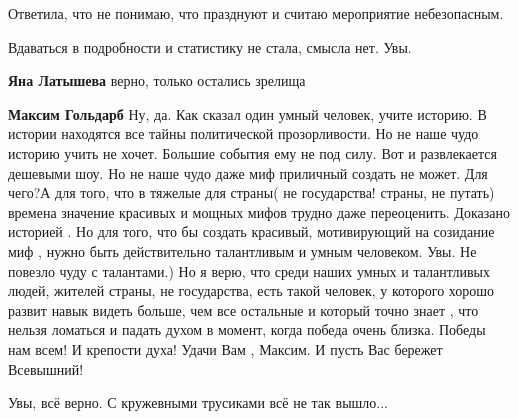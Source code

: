 \begin{itemize}
Ответила, что не понимаю, что празднуют и считаю мероприятие небезопасным.

Вдаваться в подробности и статистику не стала, смысла нет. Увы.

\begin{itemize}
 
\textbf{Яна Латышева} верно, только остались зрелища

 
\textbf{Максим Гольдарб} Ну, да. Как сказал один умный человек, учите историю.
В истории находятся все тайны политической прозорливости. Но не наше чудо
историю учить не хочет. Большие события ему не под силу. Вот и развлекается
дешевыми шоу. Но не наше чудо даже миф приличный создать не может. Для чего?А
для того, что в тяжелые для страны( не государства! страны, не путать) времена
значение красивых и мощных мифов трудно даже переоценить. Доказано историей .
Но для того, что бы создать красивый, мотивирующий на созидание миф , нужно
быть действительно талантливым и умным человеком. Увы. Не повезло чуду с
талантами.) Но я верю, что среди наших умных и талантливых людей, жителей
страны, не государства, есть такой человек, у которого хорошо развит навык
видеть больше, чем все остальные и который точно знает , что нельзя ломаться и
падать духом в момент, когда победа очень близка. Победы нам всем! И крепости
духа! Удачи Вам , Максим. И пусть Вас бережет Всевышний!
\end{itemize}

 
Увы, всё верно. С кружевными трусиками всё не так вышло...

 

\end{itemize}
